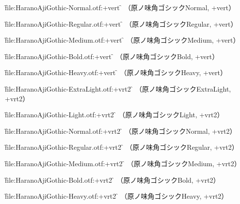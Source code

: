 \font\f{file:HaranoAjiGothic-Normal.otf:+vert} \f
\testAll
（原ノ味角ゴシックNormal, +vert）\par

\font\f{file:HaranoAjiGothic-Regular.otf:+vert} \f
\testAll
（原ノ味角ゴシックRegular, +vert）\par

\font\f{file:HaranoAjiGothic-Medium.otf:+vert} \f
\testAll
（原ノ味角ゴシックMedium, +vert）\par

\font\f{file:HaranoAjiGothic-Bold.otf:+vert} \f
\testAll
（原ノ味角ゴシックBold, +vert）\par

\font\f{file:HaranoAjiGothic-Heavy.otf:+vert} \f
\testAll
（原ノ味角ゴシックHeavy, +vert）\par


\font\f{file:HaranoAjiGothic-ExtraLight.otf:+vrt2} \f
\testAll
（原ノ味角ゴシックExtraLight, +vrt2）\par

\font\f{file:HaranoAjiGothic-Light.otf:+vrt2} \f
\testAll
（原ノ味角ゴシックLight, +vrt2）\par

\font\f{file:HaranoAjiGothic-Normal.otf:+vrt2} \f
\testAll
（原ノ味角ゴシックNormal, +vrt2）\par

\font\f{file:HaranoAjiGothic-Regular.otf:+vrt2} \f
\testAll
（原ノ味角ゴシックRegular, +vrt2）\par

\font\f{file:HaranoAjiGothic-Medium.otf:+vrt2} \f
\testAll
（原ノ味角ゴシックMedium, +vrt2）\par

\font\f{file:HaranoAjiGothic-Bold.otf:+vrt2} \f
\testAll
（原ノ味角ゴシックBold, +vrt2）\par

\font\f{file:HaranoAjiGothic-Heavy.otf:+vrt2} \f
\testAll
（原ノ味角ゴシックHeavy, +vrt2）\par

\bye
